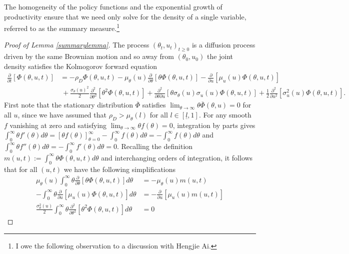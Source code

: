 \documentclass[11pt]{article}
\theoremstyle{plain}
\begin{document}
The homogeneity of the policy functions and the exponential growth of productivity ensure that we need only solve for the density of a single variable, referred to as the summary measure.\footnote{I owe the following observation to a discussion with Hengjie Ai.}

\begin{proof}[Proof of Lemma \ref{summarylemma}]
The process $(\theta_t,u_t)_{t\geq0}$ is a diffusion process driven by the same Brownian motion and so away from $(\theta_0,u_0)$ the joint density satisfies the Kolmogorov forward equation
\begin{align*}
\frac{\partial }{\partial t} [\Phi(\theta,u,t)] & = - \rho_D \Phi(\theta,u,t) - \mu_{\theta}(u)\frac{\partial}{\partial \theta}[\theta\Phi(\theta,u,t)] -\frac{\partial}{\partial u}[\mu_u(u)\Phi(\theta,u,t)] \\ & \ + \frac{\sigma_{\theta}(u)^2}{2}\frac{\partial^2}{\partial \theta^2}[\theta^2\Phi(\theta,u,t)] + \frac{\partial^2}{\partial \theta \partial u}[\theta \sigma_{\theta}(u)\sigma_u(u)\Phi(\theta,u,t)]
 + \frac{1}{2}\frac{\partial^2}{\partial u^2}[\sigma_u^2(u)\Phi(\theta,u,t)].
\end{align*}
First note that the stationary distribution $\overline{\Phi}$ satisfies $\lim_{\theta \rightarrow \infty }\theta \overline{\Phi}(\theta,u) = 0$ for all $u$, since we have assumed that $\rho_D > \mu_{\theta}(l)$ for all $l \in [\underline{l},1]$. For any smooth $f$ vanishing at zero and satisfying $\lim_{\theta \rightarrow \infty }\theta f(\theta) = 0$, integration by parts gives $\int_{0}^{\infty} \theta f'(\theta)d\theta = [\theta f(\theta)]_{\theta=0}^{\infty} - \int_{0}^{\infty}  f(\theta)d\theta = - \int_{0}^{\infty}  f(\theta)d\theta$ and $\int_{0}^{\infty} \theta f''(\theta)d\theta =  - \int_{0}^{\infty} f'(\theta)d\theta = 0$. Recalling the definition $m(u,t) := \int_{0}^{\infty}\theta\Phi(\theta,u,t)d\theta$ and interchanging orders of integration, it follows that for all $(u,t)$ we have the following simplifications
\begin{align*}  %
\mu_{\theta}(u) \int_{0}^{\infty}\theta\frac{\partial}{\partial \theta}[\theta\Phi(\theta,u,t)]d\theta & = -\mu_{\theta}(u) m(u,t)
\\  -\int_0^{\infty}\theta\frac{\partial}{\partial u}[\mu_u(u)\Phi(\theta,u,t)] d\theta & = -\frac{\partial}{\partial u} [\mu_u(u) m(u,t)]
\\ \frac{\sigma_{\theta}^2(u)}{2}\int_{0}^{\infty}\theta\frac{\partial^2}{\partial \theta^2}[\theta^2\Phi(\theta,u,t)]d\theta & = 0 

\end{align*}
\end{proof}
\end{document}
